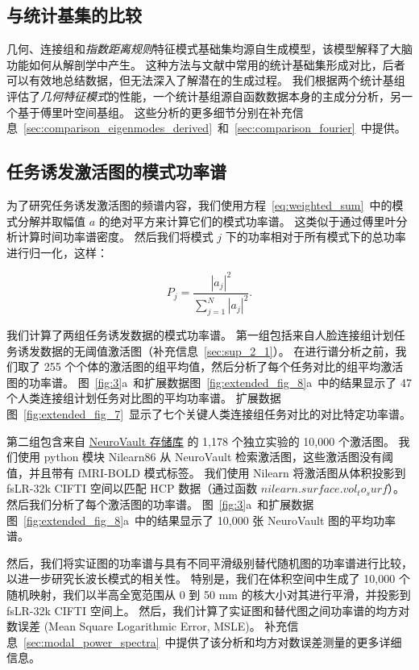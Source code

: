 \documentclass[lang=cn,a4paper,newtx,citestyle=gb7714-2015, bibstyle=gb7714-2015]{elegantpaper}
\begin{document}
\subsection{与统计基集的比较} \label{sec:sets_comparisons}

几何、连接组和\textit{指数距离规则}特征模式基础集均源自生成模型，该模型解释了大脑功能如何从解剖学中产生。
这种方法与文献中常用的统计基础集形成对比，后者可以有效地总结数据，但无法深入了解潜在的生成过程。
我们根据两个统计基组评估了\textit{几何特征模式}的性能，一个统计基组源自函数数据本身的主成分分析，另一个基于傅里叶空间基组。
这些分析的更多细节分别在补充信息~\ref{sec:comparison_eigenmodes_derived}~和~\ref{sec:comparison_fourier}~中提供。


\subsection{任务诱发激活图的模式功率谱} \label{sec:modal_power}

为了研究任务诱发激活图的频谱内容，我们使用方程~\ref{eq:weighted_sum}~中的模式分解并取幅值 $ a $ 的绝对平方来计算它们的模式功率谱。
这类似于通过傅里叶分析计算时间功率谱密度。
然后我们将模式 $ j $ 下的功率相对于所有模式下的总功率进行归一化，这样：

\begin{equation}\label{eq:normalized_power}
	P_j = \frac{|a_j|^2}{\sum_{j=1}^{N} |a_j|^2 }.
\end{equation}

我们计算了两组任务诱发数据的模式功率谱。
第一组包括来自人脸连接组计划任务诱发数据的无阈值激活图（补充信息~\ref{sec:sup_2_1}）。
在进行谱分析之前，我们取了 255 个个体的激活图的组平均值，然后分析了每个任务对比的组平均激活图的功率谱。
图~\ref{fig:3}a~和扩展数据图~\ref{fig:extended_fig_8}a~中的结果显示了 47 个人类连接组计划任务对比图的平均功率谱。 
扩展数据图~\ref{fig:extended_fig_7}~显示了七个关键人类连接组任务对比的对比特定功率谱。


第二组包含来自 \href{https://neuroVault.org/}{NeuroVault 存储库}\cite{gorgolewski2015neurovault} 的 1,178 个独立实验的 10,000 个激活图。
我们使用 python 模块 Nilearn86 从 NeuroVault 检索激活图，这些激活图没有阈值，并且带有 fMRI-BOLD 模式标签。
我们使用 Nilearn 将激活图从体积投影到 fsLR-32k CIFTI 空间以匹配 HCP 数据（通过函数 $ nilearn.surface.vol_to_surf $）。
然后我们分析了每个激活图的功率谱。
图~\ref{fig:3}a~和扩展数据图~\ref{fig:extended_fig_8}a~中的结果显示了 10,000 张 NeuroVault 图的平均功率谱。


然后，我们将实证图的功率谱与具有不同平滑级别替代随机图的功率谱进行比较，以进一步研究长波长模式的相关性。
特别是，我们在体积空间中生成了 10,000 个随机映射，我们以半高全宽范围从 0 到 50 mm 的核大小对其进行平滑，并投影到 fsLR-32k CIFTI 空间上。
然后，我们计算了实证图和替代图之间功率谱的均方对数误差 (Mean Square Logarithmic Error, MSLE)。
补充信息~\ref{sec:modal_power_spectra}~中提供了该分析和均方对数误差测量的更多详细信息。
\end{document}
